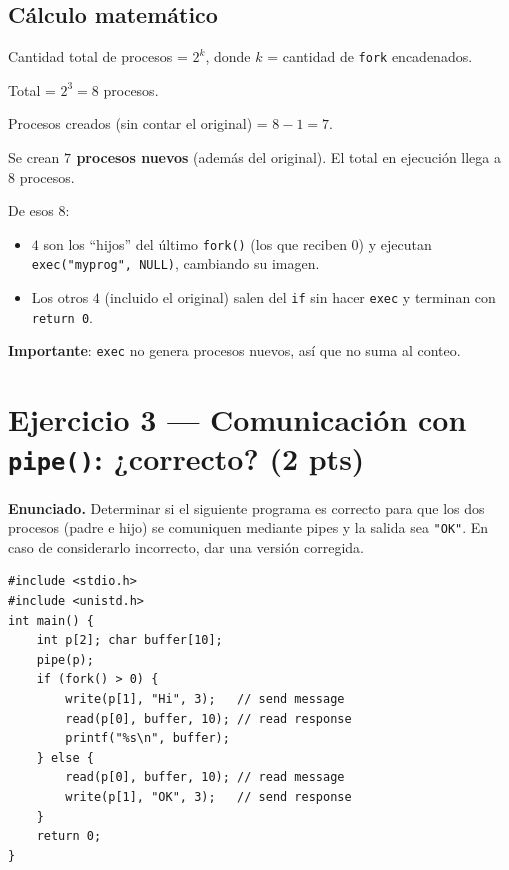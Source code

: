 \documentclass[11pt,a4paper]{article}
\begin{document}
\subsection*{Cálculo matemático}

\quad Cantidad total de procesos = $2^k$, donde $k$ = cantidad de
\texttt{fork} encadenados.

\quad Total = $2^3 = 8$ procesos.

\quad Procesos creados (sin contar el original) = $8 - 1 = 7$.

\begin{respuesta}
Se crean \textbf{$7$ procesos nuevos} (además del original). El total
en ejecución llega a $8$ procesos.

De esos $8$:
\begin{itemize}[leftmargin=*,nosep]
    \item $4$ son los ``hijos'' del último \texttt{fork()} (los que
        reciben $0$) y ejecutan \texttt{exec("myprog", NULL)},
        cambiando su imagen.
    \item Los otros $4$ (incluido el original) salen del \texttt{if}
        sin hacer \texttt{exec} y terminan con \texttt{return 0}.
\end{itemize}

\textbf{Importante}: \texttt{exec} no genera procesos nuevos, así que
no suma al conteo.
\end{respuesta}

\section{Ejercicio 3 --- Comunicación con \texttt{pipe()}: ¿correcto? (2 pts)}

\textbf{Enunciado.} Determinar si el siguiente programa es correcto
para que los dos procesos (padre e hijo) se comuniquen mediante pipes
y la salida sea \texttt{"OK"}. En caso de considerarlo incorrecto,
dar una versión corregida.

\begin{lstlisting}[style=cstyle]
#include <stdio.h>
#include <unistd.h>
int main() {
    int p[2]; char buffer[10];
    pipe(p);
    if (fork() > 0) {
        write(p[1], "Hi", 3);   // send message
        read(p[0], buffer, 10); // read response
        printf("%s\n", buffer);
    } else {
        read(p[0], buffer, 10); // read message
        write(p[1], "OK", 3);   // send response
    }
    return 0;
}
\end{lstlisting}
\end{document}
